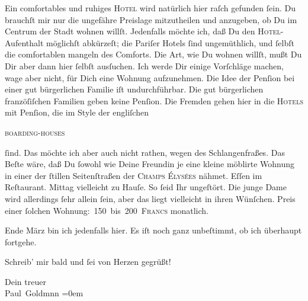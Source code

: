 \pstart
           Ein comfortables und ruhiges \textsc{Hotel} wird natürlich hier  raſch gefunden{ }ſein. Du brauchſt mir nur die
               ungefähre  Preislage mitzutheilen und anzugeben,
               ob Du im Centrum der Stadt
               wohnen willſt. Jedenfalls möchte ich, daß Du den \textsc{Hotel}-Aufenthalt möglichſt abkürzeſt; die Pariſer Hotels{ }ſind ungemüthlich, und{ }ſelbſt die comfortablen mangeln des
               Comforts. Die Art, wie Du wohnen willſt, mußt Du Dir aber dann hier{ }ſelbſt ausſuchen.
               Ich werde Dir einige Vorſchläge machen, wage aber nicht, für Dich {\pb}eine Wohnung aufzunehmen. Die Idee der Penſion bei
               einer gut bürgerlichen Familie iſt undurchführbar. Die gut bürgerlichen franzöſiſchen Familien geben
               keine Penſion. Die Fremden gehen hier in die \textsc{Hotels} mit
               Penſion, die im Style der engliſchen{ }\begin{otherlanguage}{english}\textsc{boarding-houses}\end{otherlanguage}{ }ſind. Das möchte ich aber auch nicht rathen, wegen
               des Schlangenfraßes. Das Beſte wäre, daß Du{ }ſowohl wie Deine Freundin je eine kleine möblirte Wohnung in
               einer der{ }ſtillen Seitenſtraßen der \textsc{Champs Élysées} nähmet. Eſſen im Reſtaurant. \strikeout{\textcolor{gray}{×}} Mittag vielleicht zu Hauſe. {\pb}So{ }ſeid Ihr
               ungeſtört. Die junge Dame
               wird allerdings{ }ſehr allein{ }ſein, aber das liegt vielleicht in ihren Wünſchen. Preis
               einer{ }ſolchen Wohnung: 150 bis 200 \textsc{Francs} monatlich.\pend
           
\pstart
            Ende März bin ich jedenfalls hier. Es iſt noch
               ganz unbeſtimmt, ob ich überhaupt fortgehe.\pend
           
\pstart
           Schreib’ mir bald und{ }ſei von Herzen gegrüßt!\pend
           
\pstart
           Dein treuer {\\[\baselineskip]}\spacefill\mbox{Paul Goldmnn}\pend
           \leftskip=0em{}\endnumbering{}  \newcommand{\dateiname}{L02804}\newcommand{\titel}{Paul Goldmann an Arthur Schnitzler, 24. 2. [1897]}\newcommand{\editorInnen}{Martin Anton Müller und Laura Untner}
